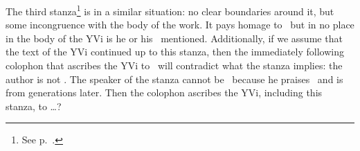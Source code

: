 The third stanza\footnote{See p.~\pageref{THETHIRDST}.} is in a similar situation: no clear boundaries around it, but some incongruence with the body of the work. It pays homage to \Sankara\ but in no place in the body of the YVi is he or his \BSBh\ mentioned. Additionally, if we assume that the text of the YVi continued up to this stanza, then the immediately following
colophon that ascribes the YVi to \Sankara\ will contradict what the stanza implies: the author is not \Sankara. The speaker of the stanza cannot be \Sankara\ because he praises \Sankara\ and is from generations later. Then the colophon ascribes the YVi, including this stanza, to \Sankara\ldots ?

